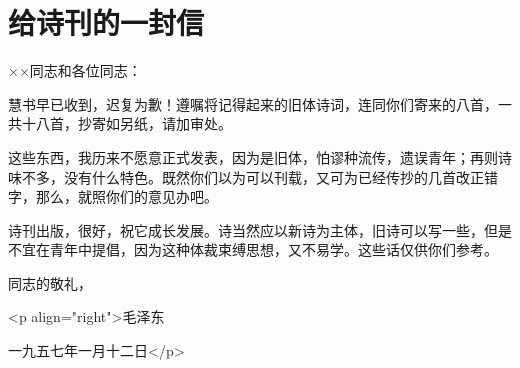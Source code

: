 \section[给诗刊的一封信（一九五七年一月十二日）]{给诗刊的一封信}


××同志和各位同志：

慧书早已收到，迟复为歉！遵嘱将记得起来的旧体诗词，连同你们寄来的八首，一共十八首，抄寄如另纸，请加审处。

这些东西，我历来不愿意正式发表，因为是旧体，怕谬种流传，遗误青年；再则诗味不多，没有什么特色。既然你们以为可以刊载，又可为已经传抄的几首改正错字，那么，就照你们的意见办吧。

诗刊出版，很好，祝它成长发展。诗当然应以新诗为主体，旧诗可以写一些，但是不宜在青年中提倡，因为这种体裁束缚思想，又不易学。这些话仅供你们参考。

同志的敬礼，

<p align="right">毛泽东

一九五七年一月十二日</p>


